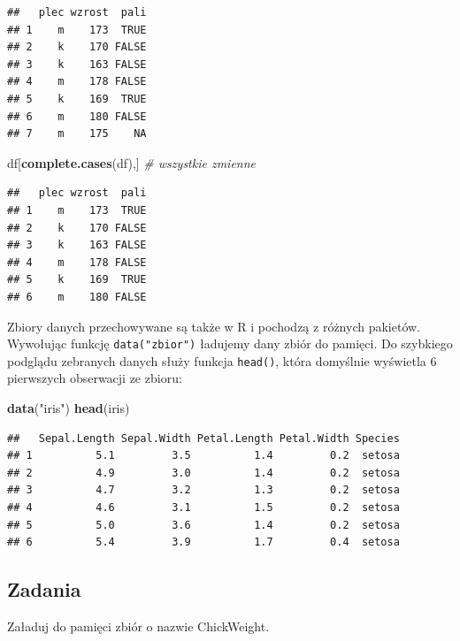 \documentclass[]{book}
\newenvironment{Shaded}{\begin{snugshade}}{\end{snugshade}}
\newcommand{\KeywordTok}[1]{\textcolor[rgb]{0.13,0.29,0.53}{\textbf{#1}}}
\newcommand{\StringTok}[1]{\textcolor[rgb]{0.31,0.60,0.02}{#1}}
\newcommand{\CommentTok}[1]{\textcolor[rgb]{0.56,0.35,0.01}{\textit{#1}}}
\newcommand{\NormalTok}[1]{#1}
\begin{document}
\begin{verbatim}
##   plec wzrost  pali
## 1    m    173  TRUE
## 2    k    170 FALSE
## 3    k    163 FALSE
## 4    m    178 FALSE
## 5    k    169  TRUE
## 6    m    180 FALSE
## 7    m    175    NA
\end{verbatim}

\begin{Shaded}
\begin{Highlighting}[]
\NormalTok{df[}\KeywordTok{complete.cases}\NormalTok{(df),] }\CommentTok{# wszystkie zmienne}
\end{Highlighting}
\end{Shaded}

\begin{verbatim}
##   plec wzrost  pali
## 1    m    173  TRUE
## 2    k    170 FALSE
## 3    k    163 FALSE
## 4    m    178 FALSE
## 5    k    169  TRUE
## 6    m    180 FALSE
\end{verbatim}

Zbiory danych przechowywane są także w R i pochodzą z różnych pakietów.
Wywołując funkcję \texttt{data("zbior")} ładujemy dany zbiór do pamięci.
Do szybkiego podglądu zebranych danych służy funkcja \texttt{head()},
która domyślnie wyświetla 6 pierwszych obserwacji ze zbioru:

\begin{Shaded}
\begin{Highlighting}[]
\KeywordTok{data}\NormalTok{(}\StringTok{"iris"}\NormalTok{)}
\KeywordTok{head}\NormalTok{(iris)}
\end{Highlighting}
\end{Shaded}

\begin{verbatim}
##   Sepal.Length Sepal.Width Petal.Length Petal.Width Species
## 1          5.1         3.5          1.4         0.2  setosa
## 2          4.9         3.0          1.4         0.2  setosa
## 3          4.7         3.2          1.3         0.2  setosa
## 4          4.6         3.1          1.5         0.2  setosa
## 5          5.0         3.6          1.4         0.2  setosa
## 6          5.4         3.9          1.7         0.4  setosa
\end{verbatim}

\subsection{Zadania}\label{zadania-1}

Załaduj do pamięci zbiór o nazwie ChickWeight.
\end{document}
